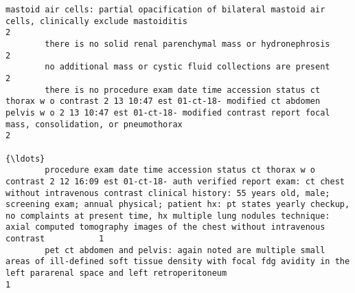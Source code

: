 \documentclass[11pt]{article}
\begin{document}
\begin{Verbatim}[commandchars=\\\{\}]
        mastoid air cells: partial opacification of bilateral mastoid air cells, clinically exclude mastoiditis                                                                                                                                                                                                                                                                                                                         2
        there is no solid renal parenchymal mass or hydronephrosis                                                                                                                                                                                                                                                                                                                                                                      2
        no additional mass or cystic fluid collections are present                                                                                                                                                                                                                                                                                                                                                                      2
        there is no procedure exam date time accession status ct thorax w o contrast 2 13 10:47 est 01-ct-18- modified ct abdomen pelvis w o 2 13 10:47 est 01-ct-18- modified contrast report focal mass, consolidation, or pneumothorax                                                                                                                                                                                               2
                                                                                                                                                                                                                                                                                                                                                                                                                                     {\ldots} 
        procedure exam date time accession status ct thorax w o contrast 2 12 16:09 est 01-ct-18- auth verified report exam: ct chest without intravenous contrast clinical history: 55 years old, male; screening exam; annual physical; patient hx: pt states yearly checkup, no complaints at present time, hx multiple lung nodules technique: axial computed tomography images of the chest without intravenous contrast           1
        pet ct abdomen and pelvis: again noted are multiple small areas of ill-defined soft tissue density with focal fdg avidity in the left pararenal space and left retroperitoneum                                                                                                                                                                                                                                                  1

\end{Verbatim}
\end{document}
